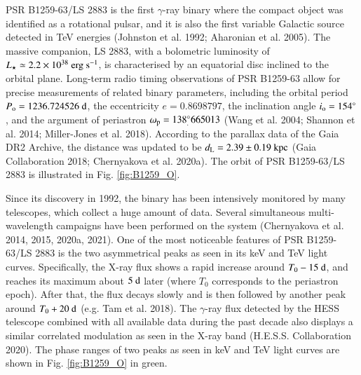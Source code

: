 \documentclass{aa}
\def\PSRB1259{PSR B1259-63/LS 2883}
\begin{document}
PSR B1259-63/LS 2883 is the first $\gamma$-ray binary where the compact object was identified as a rotational pulsar, and it is also the first variable Galactic source detected in TeV energies (Johnston et al. 1992; Aharonian et al. 2005).
The massive companion, LS 2883, with a bolometric luminosity of $L_{\star}\simeq2.2\times10^{38}\ {\rm erg\ s^{-1}}$, is characterised by an equatorial disc inclined to the orbital plane.
Long-term radio timing observations of PSR B1259-63 allow for precise measurements of related binary parameters, including the orbital period $P_{\rm o}=1236.724526\ \rm{d}$, the eccentricity $e=0.8698797$, the inclination angle $i_{\rm o}=154^{\circ}$ , and the argument of periastron $\omega_{\rm p}=138^{\circ}_.665013$ (Wang et al. 2004; Shannon et al. 2014; Miller-Jones et al. 2018). According to the parallax data of the Gaia DR2 Archive, the distance was updated to be $d_{\rm L}= 2.39\pm0.19\ {\rm kpc}$ (Gaia Collaboration 2018; Chernyakova et al. 2020a). The orbit of \PSRB1259 is illustrated in Fig. \ref{fig:B1259_O}.

Since its discovery in 1992, the binary has been intensively monitored by many telescopes, which collect a huge amount of data. Several simultaneous multi-wavelength campaigns have been performed on the system (Chernyakova et al. 2014, 2015, 2020a, 2021).
One of the most noticeable features of \PSRB1259 is the two asymmetrical peaks as seen in its keV and TeV light curves. Specifically, the X-ray flux shows a rapid increase around $T_0-15\ {\rm d}$, and reaches its maximum about $5\ {\rm d}$ later (where $T_0$ corresponds to the periastron epoch). After that, the flux decays slowly and is  then followed by another peak around $T_0+20\ {\rm d}$ (e.g. Tam et al. 2018). The $\gamma$-ray flux detected by the HESS telescope combined with all available data during the past decade also displays a similar correlated modulation as seen in the X-ray band (H.E.S.S. Collaboration 2020). The phase ranges of two peaks as seen in keV and TeV light curves are shown in Fig. \ref{fig:B1259_O} in green.
\end{document}
